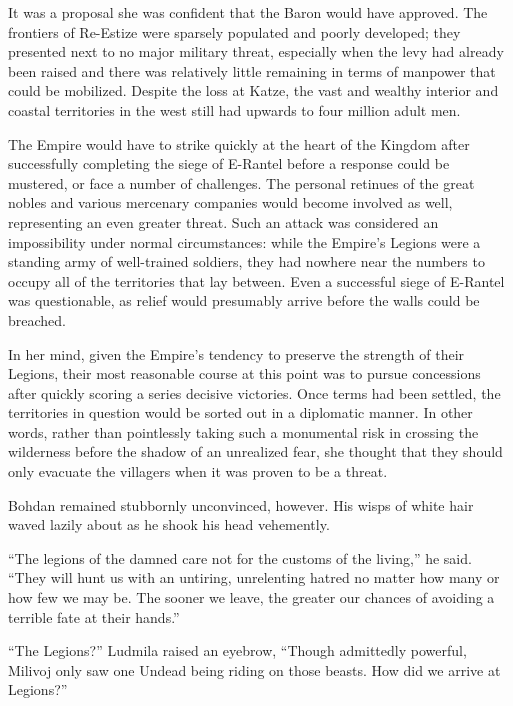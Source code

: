  

It was a proposal she was confident that the Baron would have approved. The frontiers of Re-Estize were sparsely populated and poorly developed; they presented next to no major military threat, especially when the levy had already been raised and there was relatively little remaining in terms of manpower that could be mobilized. Despite the loss at Katze, the vast and wealthy interior and coastal territories in the west still had upwards to four million adult men.

 

The Empire would have to strike quickly at the heart of the Kingdom after successfully completing the siege of E-Rantel before a response could be mustered, or face a number of challenges. The personal retinues of the great nobles and various mercenary companies would become involved as well, representing an even greater threat. Such an attack was considered an impossibility under normal circumstances: while the Empire’s Legions were a standing army of well-trained soldiers, they had nowhere near the numbers to occupy all of the territories that lay between. Even a successful siege of E-Rantel was questionable, as relief would presumably arrive before the walls could be breached.

 

In her mind, given the Empire’s tendency to preserve the strength of their Legions, their most reasonable course at this point was to pursue concessions after quickly scoring a series decisive victories. Once terms had been settled, the territories in question would be sorted out in a diplomatic manner. In other words, rather than pointlessly taking such a monumental risk in crossing the wilderness before the shadow of an unrealized fear, she thought that they should only evacuate the villagers when it was proven to be a threat.

 

Bohdan remained stubbornly unconvinced, however. His wisps of white hair waved lazily about as he shook his head vehemently.

 

“The legions of the damned care not for the customs of the living,” he said. “They will hunt us with an untiring, unrelenting hatred no matter how many or how few we may be. The sooner we leave, the greater our chances of avoiding a terrible fate at their hands.”

 

“The Legions?” Ludmila raised an eyebrow, “Though admittedly powerful, Milivoj only saw one Undead being riding on those beasts. How did we arrive at Legions?”

